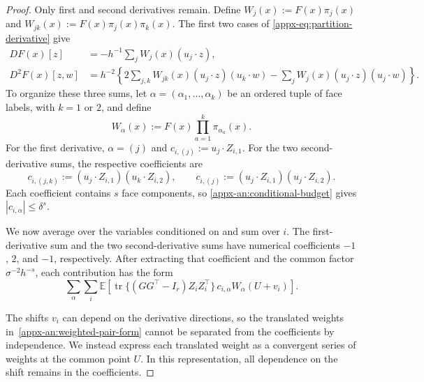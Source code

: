\documentclass[11pt,letterpaper]{article}
\theoremstyle{remark}
\newcommand{\E}{\mathbb E}
\newcommand{\tr}{\operatorname{tr}}
\begin{document}
\begin{proof}
Only first and second derivatives remain. Define
$W_j(x):=F(x)\pi_j(x)$ and
$W_{jk}(x):=F(x)\pi_j(x)\pi_k(x)$. The first two cases of
\eqref{appx-eq:partition-derivative} give
\begin{align*}
 DF(x)[z]&=-h^{-1}\sum_jW_j(x)(u_j\cdot z),\\
 D^2F(x)[z,w]&=h^{-2}\left\{
       2\sum_{j,k}W_{jk}(x)(u_j\cdot z)(u_k\cdot w)
       -\sum_jW_j(x)(u_j\cdot z)(u_j\cdot w)\right\}.
\end{align*}
To organize these three sums, let
$\alpha=(\alpha_1,\ldots,\alpha_k)$ be an ordered tuple of face
labels, with $k=1$ or $2$, and define
\[
 W_\alpha(x):=F(x)\prod_{a=1}^k\pi_{\alpha_a}(x).
\]
For the first derivative, $\alpha=(j)$ and
$c_{i,(j)}:=u_j\cdot Z_{i,1}$. For the two second-derivative
sums, the respective coefficients are
\[
 c_{i,(j,k)}:=(u_j\cdot Z_{i,1})(u_k\cdot Z_{i,2}),
 \qquad
 c_{i,(j)}:=(u_j\cdot Z_{i,1})(u_j\cdot Z_{i,2}).
\]
Each coefficient contains $s$ face components, so
\eqref{appx-an:conditional-budget} gives
$|c_{i,\alpha}|\le\delta^s$.

We now average over the variables conditioned on and sum over
$i$. The first-derivative sum and the two second-derivative sums
have numerical coefficients $-1$, $2$, and $-1$, respectively.
After extracting that coefficient and the common factor
$\sigma^{-2}h^{-s}$, each contribution has the form
\begin{equation}
 \sum_\alpha\sum_i\E\left[
  \tr\{(GG^\top-I_r)Z_iZ_i^\top\}\,
       c_{i,\alpha}W_\alpha(U+v_i)\right].
 \label{appx-an:weighted-pair-form}
\end{equation}

The shifts $v_i$ can depend on the derivative directions, so the
translated weights in~\eqref{appx-an:weighted-pair-form} cannot
be separated from the coefficients by independence. We instead
express each translated weight as a convergent series of weights
at the common point $U$. In this representation, all dependence
on the shift remains in the coefficients.


\end{proof}
\end{document}
